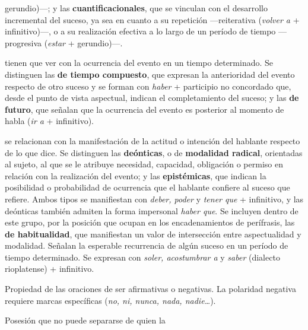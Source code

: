 \begin{glosariogeneral}
\begin{glosario}
            gerundio)---; y las
            \textbf{cuantificacionales}, que se vinculan con el desarrollo
            incremental del suceso, ya sea en cuanto a su repetición
            ---reiterativa (\textit{volver a} + infinitivo)---, o a su realización efectiva a lo
            largo de un período de tiempo ---progresiva (\textit{estar} +
            gerundio)---.
      \item[temporales:] tienen que ver con la ocurrencia del evento en un
            tiempo determinado. Se distinguen las \textbf{de tiempo compuesto},
            que expresan la anterioridad del evento respecto de otro suceso y se
            forman con \textit{haber} + participio no concordado que, desde el
            punto de vista aspectual, indican el completamiento del suceso; y
            las \textbf{de futuro}, que señalan que la ocurrencia del evento es
            posterior al momento de habla (\textit{ir a} + infinitivo).
      \item[modales:] se relacionan con la manifestación de la actitud o
            intención del hablante respecto de lo que dice. Se distinguen las
            \textbf{deónticas}, o de \textbf{modalidad radical}, orientadas al
            sujeto, al que se le atribuye necesidad, capacidad, obligación o
            permiso en relación con la realización del evento; y las
            \textbf{epistémicas}, que indican la posibilidad o probabilidad de
            ocurrencia que el hablante confiere al suceso que refiere. Ambos
            tipos se manifiestan con \textit{deber, poder} y \textit{tener que}
            + infinitivo, y las deónticas también admiten la forma impersonal
            \textit{haber que}. Se incluyen dentro de este grupo, por la
            posición que ocupan en los encadenamientos de perífrasis, las
            \textbf{de habitualidad}, que manifiestan un valor de intersección
            entre aspectualidad y modalidad. Señalan la esperable recurrencia de
            algún suceso en un período de tiempo determinado. Se expresan con
            \textit{soler, acostumbrar a} y \textit{saber} (dialecto
            rioplatense) + infinitivo.
    \end{glosario}
  \item[Polaridad:] Propiedad de las oraciones de ser afirmativas o negativas.
        La polaridad negativa requiere marcas específicas (\textit{no, ni, nunca,
        nada, nadie\ldots}).
  \item[Posesión inalienable:] Posesión que no puede separarse de quien la

\end{glosariogeneral}
